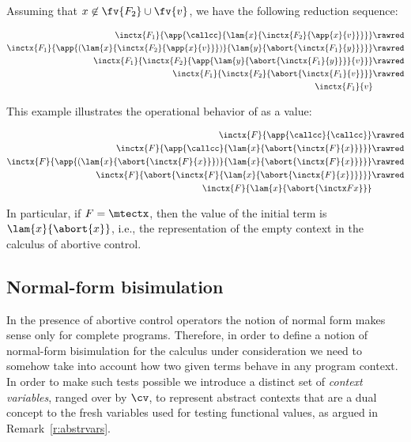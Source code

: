 \documentclass{lmcs}
\theoremstyle{defC}
\begin{document}
\begin{exa}
  Assuming that $x \not\in \fv{F_2} \cup \fv{v}$, we have the
  following reduction sequence:

  \begin{align*}
    \inctx{F_1}{\app{\callcc}{\lam{x}{\inctx{F_2}{\app{x}{v}}}}} & \rawred \\
    \inctx{F_1}{\app{(\lam{x}{\inctx{F_2}{\app{x}{v}}})}{\lam{y}{\abort{\inctx{F_1}{y}}}}} & \rawred \\
    \inctx{F_1}{\inctx{F_2}{\app{\lam{y}{\abort{\inctx{F_1}{y}}}}{v}}} & \rawred \\
    \inctx{F_1}{\inctx{F_2}{\abort{\inctx{F_1}{v}}}} & \rawred \\
    \inctx{F_1}{v} &
  \end{align*}
\end{exa}

\begin{exa}
  This example illustrates the operational behavior of \textcallcc as
  a value:

  \begin{align*}
    \inctx{F}{\app{\callcc}{\callcc}} & \rawred \\
    \inctx{F}{\app{\callcc}{\lam{x}{\abort{\inctx{F}{x}}}}} & \rawred \\
    \inctx{F}{\app{(\lam{x}{\abort{\inctx{F}{x}}})}{\lam{x}{\abort{\inctx{F}{x}}}}} & \rawred \\
    \inctx{F}{\abort{\inctx{F}{\lam{x}{\abort{\inctx{F}{x}}}}}} & \rawred \\
    \inctx{F}{\lam{x}{\abort{\inctx F {x}}}} &
  \end{align*}

  \vspace{2mm}\noindent
  In particular, if $F = \mtectx$, then the value of the initial term
  is $\lam{x}{\abort{x}}$, i.e., the representation of the empty
  context in the calculus of abortive control.
\end{exa}

\subsection{Normal-form bisimulation}

In the presence of abortive control operators the notion of normal
form makes sense only for complete programs. Therefore, in order to
define a notion of normal-form bisimulation for the calculus under
consideration we need to somehow take into account how two given terms
behave in any program context. In order to make such tests possible we
introduce a distinct set of \emph{context variables}, ranged over by
$\cv$, to represent abstract contexts that are a dual concept to the
fresh variables used for testing functional values, as argued in
Remark~\ref{r:abstrvars}.
\end{document}
